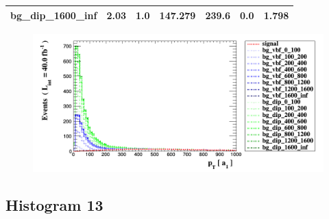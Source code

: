 \documentclass[a4paper, 10pt]{article}
\begin{document}
\begin{table}[H]
\begin{center}
\begin{tabular}{|m{23.0mm}|m{23.0mm}|m{18.0mm}|m{19.0mm}|m{19.0mm}|m{19.0mm}|m{19.0mm}|}
      \hline
      {\cellcolor{white}         bg\_dip\_1600\_inf}& {\cellcolor{white}         2.03}& {\cellcolor{white}         1.0}& {\cellcolor{white}         147.279}& {\cellcolor{white}         239.6}& {\cellcolor{green}         0.0}& {\cellcolor{green}         1.798}\\
\hline
    \end{tabular}
  \end{center}
\end{table}

\begin{figure}[H]
  \begin{center}
    \includegraphics[scale=0.45]{selection_11.png}\\
\caption{   }
  \end{center}
\end{figure}
      \newpage
\subsection{ Histogram 13}
\end{document}
